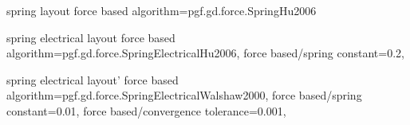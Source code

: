 

%
%
%
\pgfgddeclarealgorithmkey
  {spring layout}
  {force based}
  {
    algorithm=pgf.gd.force.SpringHu2006
  }

 
%
% 
%
\pgfgddeclarealgorithmkey
  {spring electrical layout}
  {force based}
  {
    algorithm=pgf.gd.force.SpringElectricalHu2006,
    force based/spring constant=0.2,
  }



%
%
%
\pgfgddeclarealgorithmkey
  {spring electrical layout'}
  {force based}
  {
    algorithm=pgf.gd.force.SpringElectricalWalshaw2000,
    force based/spring constant=0.01,
    force based/convergence tolerance=0.001,
  }
